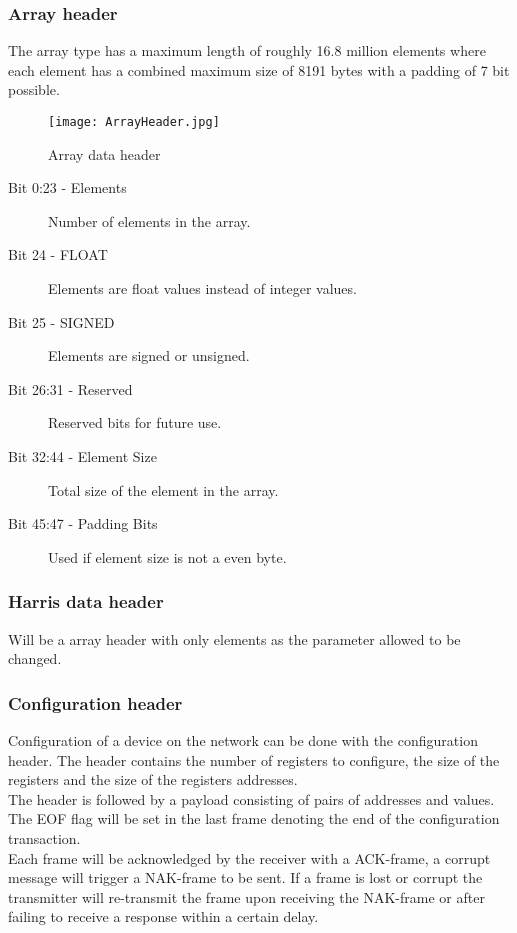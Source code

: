 \subsubsection*{Array header}
The array type has a maximum length of roughly 16.8 million elements where each element has a combined maximum size of 8191 bytes with a padding of 7 bit possible. 
\begin{figure}
\centering
\texttt{[image: ArrayHeader.jpg]}
\caption{Array data header}
\label{fig:ArrayHeader}
\end{figure}

\begin{description}
\item [Bit 0:23 - Elements] Number of elements in the array.
\item [Bit 24 - FLOAT] Elements are float values instead of integer values.
\item [Bit 25 - SIGNED] Elements are signed or unsigned.
\item [Bit 26:31 - Reserved] Reserved bits for future use.
\item [Bit 32:44 - Element Size] Total size of the element in the array.
\item [Bit 45:47 - Padding Bits] Used if element size is not a even byte.
\end{description}
\subsubsection*{Harris data header}
Will be a array header with only elements as the parameter allowed to be changed.
\subsubsection*{Configuration header}
Configuration of a device on the network can be done with the configuration header. The header contains the number of registers to configure, the size of the registers and the size of the registers addresses.
\\
The header is followed by a payload consisting of pairs of addresses and values. The EOF flag will be set in the last frame denoting the end of the configuration transaction.
\\
Each frame will be acknowledged by the receiver with a ACK-frame, a corrupt message will trigger a NAK-frame to be sent. If a frame is lost or corrupt the transmitter will re-transmit the frame upon receiving the NAK-frame or after failing to receive a response within a certain delay.

